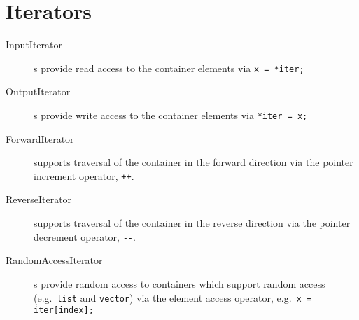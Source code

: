 \section{Iterators}

\begin{description}
  \item[InputIterator]s provide read access to the container elements
              via \verb+x = *iter;+ 
  \item[OutputIterator]s provide write access to the container elements
              via \verb+*iter = x;+ 
  \item[ForwardIterator]  supports traversal of the container in the forward 
              direction via the pointer increment operator, \verb"++".
  \item[ReverseIterator]  supports traversal of the container in the reverse
              direction via the pointer decrement operator, \verb"--".
  \item[RandomAccessIterator]s provide random access to containers which
              support random access (e.g.\ \verb+list+ and \verb+vector+)
              via the element access operator, e.g.\ \verb+x = iter[index];+
\end{description}
